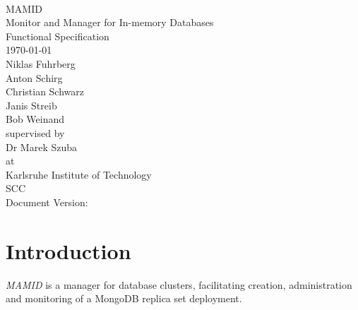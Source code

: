 \documentclass[a4paper, 11pt]{article}
\let\oldsection\section
\renewcommand\section{\clearpage\oldsection}
\begin{document}
\newcommand{\refsymbol}[0]{\scalebox{0.5}{$\nearrow$}}
\let\oldref\ref
\renewcommand{\ref}[1]{\refsymbol\oldref{#1}}
\let\oldgls\gls
\renewcommand{\gls}[1]{\refsymbol\oldgls{#1}}
\let\oldGls\Gls
\renewcommand{\Gls}[1]{\refsymbol\oldGls{#1}}
\let\oldglspl\glspl
\renewcommand{\glspl}[1]{\refsymbol\oldglspl{#1}}
\let\oldGlspl\Glspl
\renewcommand{\Glspl}[1]{\refsymbol\oldGlspl{#1}}
\let\oldglslink\glslink
\renewcommand{\glslink}[2]{\refsymbol\oldglslink{#1}{#2}}
\let\oldhyperref\hyperref
\renewcommand{\hyperref}[2][notActuallyOptional]{\refsymbol\oldhyperref[#1]{#2}}
\let\oldautoref\autoref
\renewcommand{\autoref}[1]{\refsymbol\oldautoref{#1}}

\newcommand{\abbildung}[1]{\autoref{fig:#1}}
\newcommand{\mamid}{\textit{MAMID}\xspace}



\begin{titlepage}
\makeatletter
\begin{center}
~\\[4em]
{\Huge MAMID}\\[.8em]\huge{Monitor and Manager for In-memory Databases}\\[2em]
{\huge Functional Specification}\\[1em]
{\large\today}\\[2.5em]
{\LARGE
Niklas Fuhrberg\\
Anton Schirg\\
Christian Schwarz\\
Janis Streib\\
Bob Weinand\\[3em]}
{\Large supervised by}\\[2em]
{\LARGE
Dr Marek Szuba\\[1em]}
{\Large at}\\[1em]
{\LARGE
Karlsruhe Institute of Technology\\
SCC\\[2em]}
{\color{gray}
  \small Document Version: 
}
\end{center}
\makeatother
\end{titlepage}
\newpage
\tableofcontents
\newpage

\section{Introduction}
\mamid is a manager for database \glspl{cluster}, facilitating creation, administration and monitoring of a \gls{MongoDB} \gls{replica set} deployment.
\end{document}
